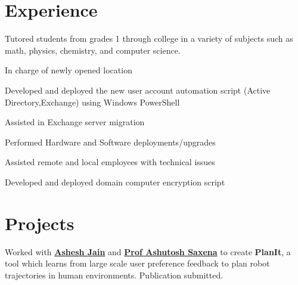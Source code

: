 \documentclass[]{DavidTsenterResume}
\begin{document}
\begin{minipage}[t]{0.66\textwidth} 


\section{Experience}

\vspace{\topsep} %
\begin{tightemize}
\item Tutored students from grades 1 through college in a variety of subjects such as
math, physics, chemistry, and computer science.
\item In charge of newly opened location
\end{tightemize}
\sectionsep


\begin{tightemize}\item Developed and deployed the new user account automation script (Active Directory,Exchange) using Windows PowerShell
\item Assisted in Exchange server migration
\end{tightemize}
\sectionsep

\begin{tightemize}
\item Performed Hardware and Software deployments/upgrades
\item Assisted remote and local employees with technical issues 
\item Developed and deployed domain computer encryption script

\end{tightemize}
\sectionsep




\section{Projects}
Worked with \textbf{\href{http://www.cs.cornell.edu/~ashesh/}{Ashesh Jain}} and \textbf{\href{http://www.cs.cornell.edu/~asaxena/}{Prof Ashutosh Saxena}} to create \textbf{PlanIt}, a tool which  learns from large scale user preference feedback to plan robot trajectories in human environments.  Publication submitted.
\sectionsep


\end{minipage}
\end{document}
